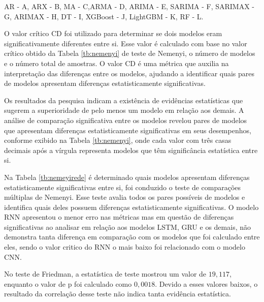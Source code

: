 \begin{table}[!htb]
	AR - A,	ARX	- B, MA	- C,ARMA - D, ARIMA - E, SARIMA - F, SARIMAX - G, ARIMAX	- H, DT	- I, XGBoost - J, LightGBM - K, RF - L.
	
\end{table}


O valor crítico CD foi utilizado para determinar se dois modelos eram significativamente diferentes entre si. Esse valor é calculado com base no valor crítico obtido da Tabela \ref{tb:nemenyi} de teste de Nemenyi, o número de modelos e o número total de amostras. O valor CD é uma métrica que auxilia na interpretação das diferenças entre os modelos, ajudando a identificar quais pares de modelos apresentam diferenças estatisticamente significativas.

Os resultados da pesquisa indicam a existência de evidências estatísticas que sugerem a superioridade de pelo menos um modelo em relação aos demais. A análise de comparação significativa entre os modelos revelou pares de modelos que apresentam diferenças estatisticamente significativas em seus desempenhos, conforme exibido na Tabela \ref{tb:nemenyi}, onde cada valor com três casas decimais após a vírgula representa modelos que têm significância estatística entre si.

Na Tabela \ref{tb:nemeyirede} é determinado quais modelos apresentam diferenças estatisticamente significativas entre si, foi conduzido o teste de comparações múltiplas de Nemenyi. Esse teste avalia todos os pares possíveis de modelos e identifica quais deles possuem diferenças estatisticamente significativas. O modelo RNN apresentou o menor erro nas métricas mas em questão de diferenças significativas ao analisar em relação aos modelos LSTM, GRU e os demais, não demonstra tanta diferença em comparação com os modelos que foi calculado entre eles, sendo o valor critico do RNN o mais baixo foi relacionado com o modelo CNN.

No teste de Friedman, a estatística de teste mostrou um valor de $19,117$, enquanto o valor de p foi calculado como $0,0018$. Devido a esses valores baixos, o resultado da correlação desse teste não indica tanta evidência estatística.

